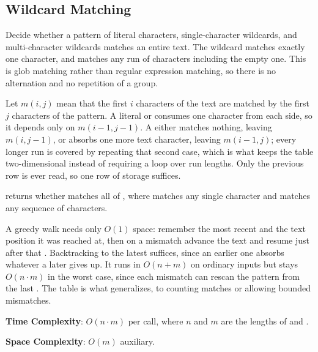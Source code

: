 \subsection{Wildcard Matching}
\label{sec:3.6.4}
Decide whether a pattern of literal characters, single-character wildcards, and multi-character wildcards matches an entire text. The wildcard  matches exactly one character, and \inlinecode{*} matches any run of characters including the empty one. This is glob matching rather than regular expression matching, so there is no alternation and no repetition of a group.

Let $m(i, j)$ mean that the first $i$ characters of the text are matched by the first $j$ characters of the pattern. A literal or  consumes one character from each side, so it depends only on $m(i - 1, j - 1)$. A \inlinecode{*} either matches nothing, leaving $m(i, j - 1)$, or absorbs one more text character, leaving $m(i - 1, j)$; every longer run is covered by repeating that second case, which is what keeps the table two-dimensional instead of requiring a loop over run lengths. Only the previous row is ever read, so one row of storage suffices.

\begin{compactitem}
  \item {} returns whether  matches all of , where  matches any single character and \inlinecode{*} matches any sequence of characters.
\end{compactitem}

A greedy walk needs only $O(1)$ space: remember the most recent \inlinecode{*} and the text position it was reached at, then on a mismatch advance the text and resume just after that \inlinecode{*}. Backtracking to the latest \inlinecode{*} suffices, since an earlier one absorbs whatever a later gives up. It runs in $O(n + m)$ on ordinary inputs but stays $O(n \cdot m)$ in the worst case, since each mismatch can rescan the pattern from the last \inlinecode{*}. The table is what generalizes, to counting matches or allowing bounded mismatches.

\textbf{Time Complexity}: $O(n \cdot m)$ per call, where $n$ and $m$ are the lengths of  and .

\textbf{Space Complexity}: $O(m)$ auxiliary.

